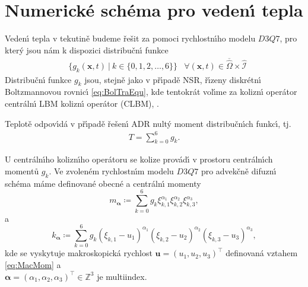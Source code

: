     \section{Numerick\'{e} sch\'{e}ma pro veden\'{\i} tepla}
    \label{sec:NumSchtemFlo}
    

        Veden\'{\i} tepla v tekutin\v{e} budeme \v{r}e\v{s}it za pomoci rychlostn\'{\i}ho modelu $D3Q7$, pro kter\'{y} jsou n\'{a}m k dispozici distribu\v{c}n\'{\i} funkce 
        \begin{align}
            &\{ g_k(\boldsymbol{x}, t)\ | \ k \in \{0,1,2,\dots,6 \} \} & \forall (\boldsymbol{x}, t) \in \overline{\hat{\Omega}} \times \mathcal{\hat{I}} \label{eq:SetDisFunADE}
        \end{align}
        Distribu\v{c}n\'{\i} funkce $g_k$ jsou, stejn\v{e} jako v p\v{r}\'{\i}pad\v{e} NSR, \v{r}\'{\i}zeny diskr\'{e}tn\'{\i} Boltzmannovou rovnic\'{\i} \eqref{eq:BolTraEqu}, kde tentokr\'{a}t vol\'{\i}me za kolizn\'{\i} oper\'{a}tor centr\'{a}ln\'{\i} LBM kolizn\'{\i} oper\'{a}tor (CLBM), \cite{geier2007properties}.

        Teplot\v{e} odpov\'{\i}d\'{a} v p\v{r}\'{\i}pad\v{e} \v{r}e\v{s}en\'{\i} ADR nult\'{y} moment distribu\v{c}n\'{\i}ch funkc\'{\i}, tj.
        \begin{align}
            T = \sum_{k=0}^6 g_k. \label{eq:ComputeTemp}
        \end{align}

         U centr\'{a}ln\'{\i}ho kolizn\'{\i}ho oper\'{a}toru se kolize prov\'{a}d\'{\i} v prostoru centr\'{a}ln\'{\i}ch moment\r{u} $g_k$. Ve zvolen\'{e}m rychlostn\'{\i}m modelu $D3Q7$ pro advek\v{c}n\v{e} difuzn\'{\i} sch\'{e}ma m\'{a}me definovan\'{e} obecn\'{e} a centr\'{a}ln\'{\i} momenty
        \begin{equation}
            \label{eq:RawMom}
                m_{\boldsymbol{\boldsymbol{\alpha}}} \coloneqq \sum_{k=0}^{6}g_k \xi_{k,1}^{\alpha_1}{\xi}_{k,2}^{\alpha_2}\xi_{k,3}^{\alpha_3},
            \end{equation}
            a
            \begin{equation}
            \label{eq:CenMom}
                k_{\boldsymbol{\boldsymbol{\alpha}}} \coloneqq \sum_{k=0}^{6}g_k ({\xi}_{k,1} - {u}_{1})^{\alpha_1}({\xi}_{k,2} - {u}_{2})^{\alpha_2}({\xi}_{k,3} - {u}_{3})^{\alpha_3}, 
        \end{equation}
        kde se vyskytuje makroskopick\'{a} rychlost $\boldsymbol{u} = (u_1, u_2, u_3)^\intercal$ definovan\'{a} vztahem \eqref{eq:MacMom} a \\ $\boldsymbol{\alpha} = (\alpha_1, \alpha_2, \alpha_3)^\intercal \in \mathbb{Z}^3$ je multiindex.
        
